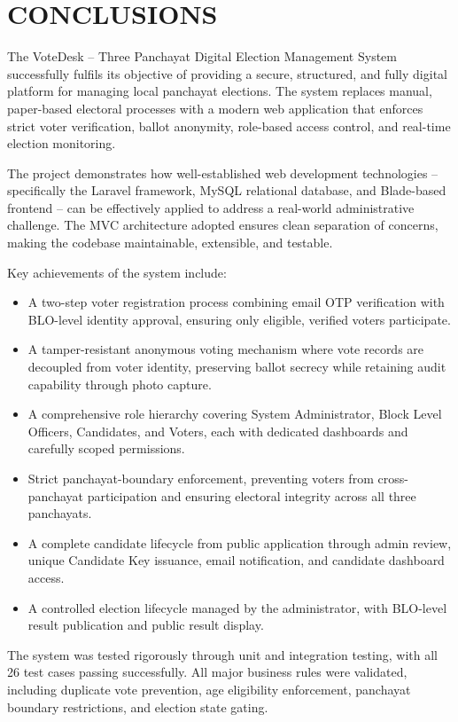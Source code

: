\chapter{CONCLUSIONS}

The VoteDesk -- Three Panchayat Digital Election Management System successfully fulfils its objective of providing a secure, structured, and fully digital platform for managing local panchayat elections. The system replaces manual, paper-based electoral processes with a modern web application that enforces strict voter verification, ballot anonymity, role-based access control, and real-time election monitoring.

The project demonstrates how well-established web development technologies -- specifically the Laravel framework, MySQL relational database, and Blade-based frontend -- can be effectively applied to address a real-world administrative challenge. The MVC architecture adopted ensures clean separation of concerns, making the codebase maintainable, extensible, and testable.

Key achievements of the system include:

\begin{itemize}
    \item A two-step voter registration process combining email OTP verification with BLO-level identity approval, ensuring only eligible, verified voters participate.
    \item A tamper-resistant anonymous voting mechanism where vote records are decoupled from voter identity, preserving ballot secrecy while retaining audit capability through photo capture.
    \item A comprehensive role hierarchy covering System Administrator, Block Level Officers, Candidates, and Voters, each with dedicated dashboards and carefully scoped permissions.
    \item Strict panchayat-boundary enforcement, preventing voters from cross-panchayat participation and ensuring electoral integrity across all three panchayats.
    \item A complete candidate lifecycle from public application through admin review, unique Candidate Key issuance, email notification, and candidate dashboard access.
    \item A controlled election lifecycle managed by the administrator, with BLO-level result publication and public result display.
\end{itemize}

The system was tested rigorously through unit and integration testing, with all 26 test cases passing successfully. All major business rules were validated, including duplicate vote prevention, age eligibility enforcement, panchayat boundary restrictions, and election state gating.

